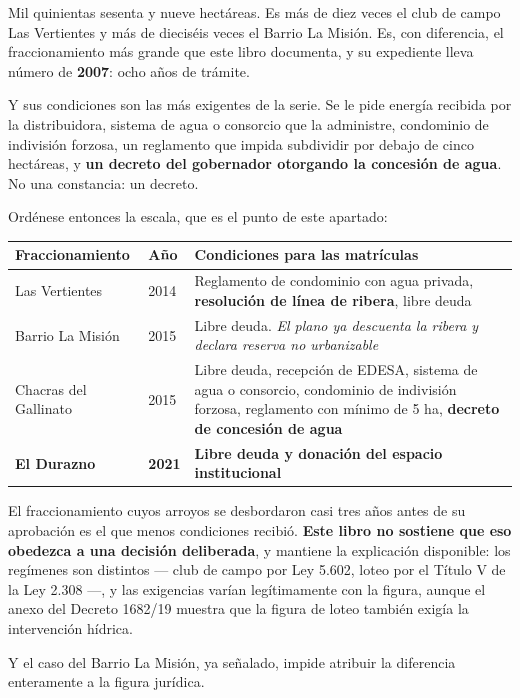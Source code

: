 \begin{cautela}
Mil quinientas sesenta y nueve hectáreas. Es más de diez veces el club de campo Las Vertientes y más de dieciséis veces el Barrio La Misión. Es, con diferencia, el fraccionamiento más grande que este libro documenta, y su expediente lleva número de \textbf{2007}: ocho años de trámite.

Y sus condiciones son las más exigentes de la serie. Se le pide energía recibida por la distribuidora, sistema de agua o consorcio que la administre, condominio de indivisión forzosa, un reglamento que impida subdividir por debajo de cinco hectáreas, y \textbf{un decreto del gobernador otorgando la concesión de agua}. No una constancia: un decreto.

Ordénese entonces la escala, que es el punto de este apartado:

\begin{center}\small
\begin{tabular}{@{}p{3.5cm}p{3.0cm}p{5.6cm}@{}}
\toprule
\textbf{Fraccionamiento} & \textbf{Año} & \textbf{Condiciones para las matrículas} \\
\midrule
Las Vertientes & 2014 & Reglamento de condominio con agua privada, \textbf{resolución de línea de ribera}, libre deuda \\
Barrio La Misión & 2015 & Libre deuda. \textit{El plano ya descuenta la ribera y declara reserva no urbanizable} \\
Chacras del Gallinato & 2015 & Libre deuda, recepción de EDESA, sistema de agua o consorcio, condominio de indivisión forzosa, reglamento con mínimo de 5 ha, \textbf{decreto de concesión de agua} \\
\textbf{El Durazno} & \textbf{2021} & \textbf{Libre deuda y donación del espacio institucional} \\
\bottomrule
\end{tabular}
\end{center}

El fraccionamiento cuyos arroyos se desbordaron casi tres años antes de su aprobación es el que menos condiciones recibió. \textbf{Este libro no sostiene que eso obedezca a una decisión deliberada}, y mantiene la explicación disponible: los regímenes son distintos --- club de campo por Ley 5.602, loteo por el Título V de la Ley 2.308 ---, y las exigencias varían legítimamente con la figura, aunque el anexo del Decreto 1682/19 muestra que la figura de loteo también exigía la intervención hídrica.

Y el caso del Barrio La Misión, ya señalado, impide atribuir la diferencia enteramente a la figura jurídica.
\end{cautela}

